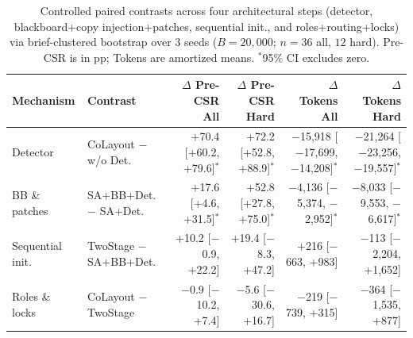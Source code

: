 \begin{table}[t]
\centering
\caption{Controlled paired contrasts across four architectural steps (detector, blackboard+copy injection+patches, sequential init., and roles+routing+locks) via brief-clustered bootstrap over 3 seeds ($B=20{,}000$; $n=36$ all, $12$ hard). Pre-CSR is in pp; Tokens are amortized means. $^*$95\% CI excludes zero.}
\label{tab:contrasts}
\footnotesize
\setlength{\tabcolsep}{2.7pt}
\begin{tabular}{@{}llrrrr@{}}
\toprule
Mechanism & Contrast & $\Delta$ Pre-CSR All & $\Delta$ Pre-CSR Hard & $\Delta$ Tokens All & $\Delta$ Tokens Hard \\
\midrule
Detector & CoLayout $-$ w/o Det. & +70.4 [+60.2, +79.6]$^*$ & +72.2 [+52.8, +88.9]$^*$ & $-$15,918 [$-$17,699, $-$14,208]$^*$ & $-$21,264 [$-$23,256, $-$19,557]$^*$ \\
BB \& patches & SA+BB+Det. $-$ SA+Det. & +17.6 [+4.6, +31.5]$^*$ & +52.8 [+27.8, +75.0]$^*$ & $-$4,136 [$-$5,374, $-$2,952]$^*$ & $-$8,033 [$-$9,553, $-$6,617]$^*$ \\
Sequential init. & TwoStage $-$ SA+BB+Det. & +10.2 [$-$0.9, +22.2] & +19.4 [$-$8.3, +47.2] & +216 [$-$663, +983] & $-$113 [$-$2,204, +1,652] \\
Roles \& locks & CoLayout $-$ TwoStage & $-$0.9 [$-$10.2, +7.4] & $-$5.6 [$-$30.6, +16.7] & $-$219 [$-$739, +315] & $-$364 [$-$1,535, +877] \\
\bottomrule
\end{tabular}
\end{table}
